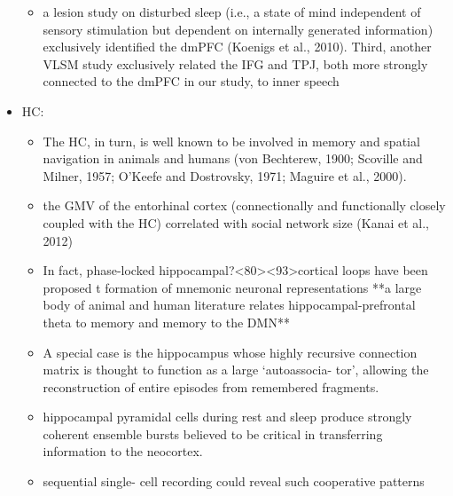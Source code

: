 \documentclass{article} %
\begin{document}
\begin{itemize}
\begin{itemize}
\item a lesion study on disturbed sleep (i.e., a state of mind
independent of sensory stimulation but dependent on
internally generated information) exclusively identified
the dmPFC (Koenigs et al., 2010). Third, another VLSM study exclusively
related the IFG and TPJ, both more strongly connected to the
dmPFC in our study, to inner speech
\end{itemize}






\item HC:
\begin{itemize}
  \item
The HC, in turn, is well known to be involved in memory and spatial navigation in animals and humans (von Bechterew, 1900; Scoville and Milner, 1957; O’Keefe and Dostrovsky, 1971; Maguire et al., 2000).

\item
the GMV of the entorhinal cortex (connectionally and functionally closely coupled with the HC) correlated with social network size (Kanai et al., 2012)


\item 
In fact, phase-locked hippocampal?<80><93>cortical loops have been proposed t
formation of mnemonic neuronal representations
**a large body of animal and human literature relates
hippocampal-prefrontal theta to memory and memory to the DMN**


\item 
A special case is the hippocampus whose highly recursive connection matrix is thought to function as a large ‘autoassocia- tor’, allowing the reconstruction of entire episodes from remembered fragments.

\item
hippocampal pyramidal cells during rest and sleep produce strongly coherent ensemble bursts believed to be critical in transferring information to the neocortex.

\item
sequential single- cell recording could reveal such cooperative patterns


\end{itemize}
\end{itemize}
\end{document}
